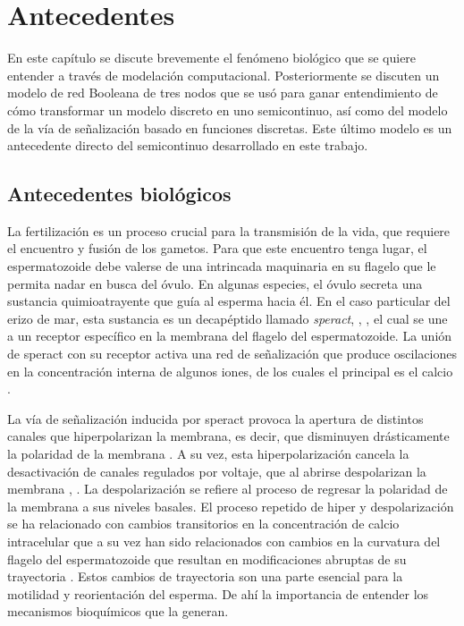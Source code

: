 \chapter{Antecedentes}\label{ch:antecedentes}

En este capítulo se discute brevemente el fenómeno biológico que se quiere entender a través de modelación computacional. Posteriormente se discuten un modelo de red Booleana de tres nodos que se usó para ganar entendimiento de cómo transformar un modelo discreto en uno semicontinuo, así como del modelo de la vía de señalización basado en funciones discretas. Este último modelo es un antecedente directo del semicontinuo desarrollado en este trabajo.

\section{Antecedentes biol\'ogicos}

La fertilización es un proceso crucial para la transmisión de la vida, que requiere el encuentro y fusión de los gametos. Para que este encuentro tenga lugar, el espermatozoide debe valerse de una intrincada maquinaria en su flagelo que le permita nadar en busca del óvulo. En algunas especies, el óvulo secreta una sustancia quimioatrayente que guía al esperma hacia él. En el caso particular del erizo de mar, esta sustancia es un decapéptido llamado \emph{speract}, \citeauthor{SUZUKI:1995gp} \citep{SUZUKI:1995gp}, \citeauthor{Hansbrough:1981vk} \citep{Hansbrough:1981vk}, el cual se une a un receptor específico en la membrana del flagelo del espermatozoide. La unión de speract con su receptor activa una red de señalización que produce oscilaciones en la concentración interna de algunos iones, de los cuales el principal es el calcio \citeauthor{Darszon2008} \citep{Darszon2008}. 

La vía de señalización inducida por speract provoca la apertura de distintos canales que hiperpolarizan la membrana, es decir, que disminuyen drásticamente la polaridad de la membrana \citeauthor{Kaupp:2008gv} \citep{Kaupp:2008gv}. A su vez, esta hiperpolarización cancela la desactivación de canales regulados por voltaje, que al abrirse despolarizan la membrana \citeauthor{Strunker:2006tk} \citep{Strunker:2006tk}, \citeauthor{GranadosGonzalez:2005ia} \citep{GranadosGonzalez:2005ia}. La despolarización se refiere al proceso de regresar la polaridad de la membrana a sus niveles basales. El proceso repetido de hiper y despolarización se ha relacionado con cambios transitorios en la concentración de calcio intracelular que a su vez han sido relacionados con cambios en la curvatura del flagelo del espermatozoide que resultan en modificaciones abruptas de su trayectoria \citeauthor{Darszon2008} \citep{Darszon2008}. Estos cambios de trayectoria son una parte esencial para la motilidad y reorientación del esperma. De ahí la importancia de entender los mecanismos bioquímicos que la generan. 

